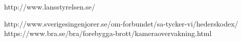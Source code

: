 \documentclass[oneside,11pt]{Latex/Classes/PhDthesisPSnPDF}
\begin{document}
\begin{multicols}{2} %
\begin{tiny} %



\end{tiny}
\end{multicols}







%

%


\begin{thebibliography}{50}

 http://www.lansstyrelsen.se/

 http://www.sverigesingenjorer.se/om-forbundet/sa-tycker-vi/hederskodex/
 https://www.bra.se/bra/forebygga-brott/kameraovervakning.html

\end{thebibliography}
 
\end{document}

